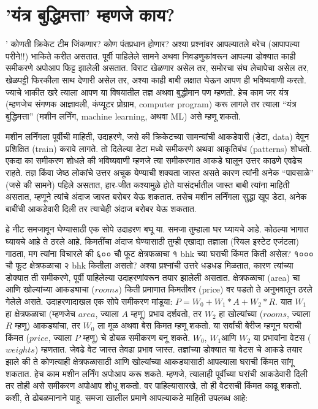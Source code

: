 \chapter{'यंत्र बुद्धिमत्ता' म्हणजे काय?}'
कोणती क्रिकेट टीम जिंकणार? कोण पंतप्रधान होणार? अश्या प्रश्नांवर आपल्यातले बरेच (आपापल्या परीने!!) भाकिते करीत असतात. पूर्वी पाहिलेले सामने अथवा निवडणुकांवरून आपल्या डोक्यात काही समीकरणे अपोआप फिट्ट झालेली असतात. विराट खेळणार असेल तर, समोरचा संघ लेचापेचा असेल तर, खेळपट्टी फिरकीला साथ देणारी असेल तर, अश्या काही बाबी लक्षात घेऊन आपण ही भविष्यवाणी करतो. ज्याचे भाकीत खरे त्याला आपण या विषयातील तज्ञ अथवा बुद्धीमान पण म्हणतो. हेच काम जर यंत्र (म्हणजेच संगणक आज्ञावली, कंप्यूटर प्रोग्राम, computer program) करू लागले तर त्याला ``यंत्र बुद्धिमत्ता'' (मशीन लर्निंग, machine learning, अथवा ML) असे म्हणू शकतो.

मशीन लर्निंगला पूर्वीची माहिती, उदाहरणे, जसे की क्रिकेटच्या सामन्यांची आकडेवारी (डेटा, data) देवून प्रशिक्षित (train) करावे लागते. तो दिलेल्या डेटा मध्ये समीकरणे अथवा आकृतिबंध (patterns) शोधतो. एकदा का समीकरण शोधले की भविष्यवाणी म्हणजे त्या समीकरणात आकडे घालून उत्तर काढणे एवढेच राहते. तज्ञ किंवा जेष्ठ लोकांचे उत्तर अचूक येण्याची शक्यता जास्त असते कारण त्यांनी अनेक ``पावसाळे'' (जसे की सामने) पहिले असतात, हार-जीत कश्यामुळे होते यासंदर्भातील जास्त बाबी त्यांना माहिती असतात, म्हणूने त्यांचे अंदाज जास्त बरोबर येऊ शकतात. तसेच मशीन लर्निंगला सुद्धा खूप डेटा, अनेक बाबींची आकडेवारी दिली तर त्याचेही अंदाज बरोबर येऊ शकतात.

हे नीट समजावून घेण्यासाठी एक सोपे उदाहरण बघू या. समजा तुम्हाला घर घ्यायचे आहे. कोठल्या भागात घ्यायचे आहे ते ठरले आहे. किमतींचा अंदाज घेण्यासाठी तुम्ही एखाद्या तज्ञाला (रियल इस्टेट एजंटला) गाठता, मग त्यांना विचारले की ६०० चौ फूट क्षेत्रफळाचा १ bhk च्या घराची किंमत किती असेल? १००० चौ फूट क्षेत्रफळाचा २ bhk कितीला असतो? अश्या प्रश्नांची उत्तरे धडधड मिळतात, कारण त्यांच्या डोक्यात ती समीकरणे, पूर्वी पाहिलेल्या उदाहरणांवरून तयार झालेली असतात. क्षेत्रफळाचा (area) चा आणि खोल्यांच्या आकड्याचा ($rooms$) किती प्रमाणात किमतीवर (price) वर पडतो ते अनुभवातून ठरले गेलेले असते. उदाहरणादाखल एक सोपे समीकरण मांडूया: $P = W_0 + W_1 * A + W_2 * R$. यात $W_1$ हा क्षेत्रफळाचा (म्हणजेच $area$, ज्याला $A$ म्हणू) प्रभाव दर्शवतो, तर $W_2$ हा खोल्यांच्या ($rooms$, ज्याला $R$ म्हणू) आकड्यांचा, तर $W_0$ ला मूळ अथवा बेस किमत म्हणू शकतो. या सर्वांची बेरीज म्हणून घराची किंमत ($price$, ज्याला $P$ म्हणू) चे ढोबळ समीकरण बनू शकते. $W_0$, $W_1 $आणि $W_2$ या प्रभावांना वेटस ($weights$) म्हणतात. जेवढे वेट जास्त तेवढा प्रभाव जास्त. तज्ञांच्या डोक्यात या वेटस चे आकडे तयार झाले की ते कोणत्याही क्षेत्रफळासाठी आणि खोल्यांच्या आकड्यासाठी आपल्याला घराची किंमत सांगू शकतात. हेच काम मशीन लर्निंग अपोआप करू शकते. म्हणजे, त्यालाही पूर्वीच्या घरांची आकडेवारी दिली तर तोही असे समीकरण अपोआप शोधू शकतो. वर पाहिल्यासारखे, तो ही वेटसची किंमत काढू शकतो. कशी, ते ढोबळमानाने पाहू. समजा खालील प्रमाणे आपल्याकडे माहिती उपलब्ध आहे:

